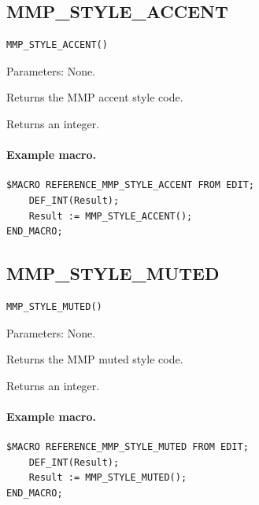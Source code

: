 \documentclass[a4paper,10pt,twoside,openany]{book}
\newenvironment{mrmacextension}{\begin{changebar}}{\end{changebar}}
\begin{document}
\begin{mrmacextension}
\label{prim:intrinsic-mmp-style-accent}
\subsection*{MMP\_STYLE\_ACCENT}
\begin{verbatim}
MMP_STYLE_ACCENT()
\end{verbatim}
Parameters: None.

Returns the MMP accent style code.

Returns an integer.

\paragraph{Example macro.}
\begin{verbatim}
$MACRO REFERENCE_MMP_STYLE_ACCENT FROM EDIT;
    DEF_INT(Result);
    Result := MMP_STYLE_ACCENT();
END_MACRO;
\end{verbatim}
\end{mrmacextension}

\begin{mrmacextension}
\label{prim:intrinsic-mmp-style-muted}
\subsection*{MMP\_STYLE\_MUTED}
\begin{verbatim}
MMP_STYLE_MUTED()
\end{verbatim}
Parameters: None.

Returns the MMP muted style code.

Returns an integer.

\paragraph{Example macro.}
\begin{verbatim}
$MACRO REFERENCE_MMP_STYLE_MUTED FROM EDIT;
    DEF_INT(Result);
    Result := MMP_STYLE_MUTED();
END_MACRO;
\end{verbatim}
\end{mrmacextension}
\end{document}

